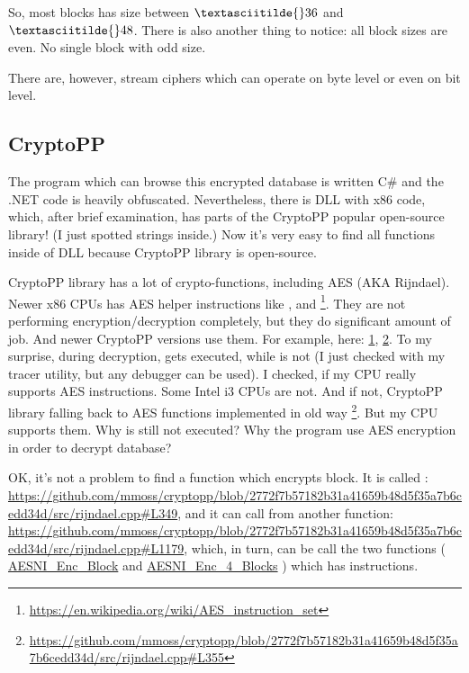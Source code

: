So, most blocks has size between $\textasciitilde{}36$ and $\textasciitilde{}48$.
There is also another thing to notice: all block sizes are even.
No single block with odd size.

There are, however, stream ciphers which can operate on byte level or even on bit level.

\subsection{CryptoPP}

The program which can browse this encrypted database is written C\# and the .NET code
is heavily obfuscated.
Nevertheless, there is DLL with x86 code, which, after brief examination,
has parts of the CryptoPP popular open-source library!
(I just spotted  strings inside.)
Now it's very easy to find all functions inside of DLL because CryptoPP library is open-source.

CryptoPP library has a lot of crypto-functions, including AES (AKA Rijndael).
Newer x86 CPUs has AES helper instructions like ,  and 
\footnote{\url{https://en.wikipedia.org/wiki/AES_instruction_set}}.
They are not performing encryption/decryption completely, but they do significant amount of job.
And newer CryptoPP versions use them.
For example, here:
\href{https://github.com/mmoss/cryptopp/blob/2772f7b57182b31a41659b48d5f35a7b6cedd34d/src/rijndael.cpp#L1034}{1},
\href{https://github.com/mmoss/cryptopp/blob/2772f7b57182b31a41659b48d5f35a7b6cedd34d/src/rijndael.cpp#L1000}{2}.
To my surprise, during decryption,  gets executed, while  is not
(I just checked with my tracer utility, but any debugger can be used).
I checked, if my CPU really supports AES instructions. Some Intel i3 CPUs are not.
And if not, CryptoPP library falling back to AES functions implemented in old way
\footnote{\url{https://github.com/mmoss/cryptopp/blob/2772f7b57182b31a41659b48d5f35a7b6cedd34d/src/rijndael.cpp#L355}}.
But my CPU supports them.
Why  is still not executed?
Why the program use AES encryption in order to decrypt database?

OK, it's not a problem to find a function which encrypts block.
It is called :\\
\url{https://github.com/mmoss/cryptopp/blob/2772f7b57182b31a41659b48d5f35a7b6cedd34d/src/rijndael.cpp#L349},
and it can call from another function: \\
\url{https://github.com/mmoss/cryptopp/blob/2772f7b57182b31a41659b48d5f35a7b6cedd34d/src/rijndael.cpp#L1179},
which, in turn, can be call the two functions (
\href{https://github.com/mmoss/cryptopp/blob/2772f7b57182b31a41659b48d5f35a7b6cedd34d/src/rijndael.cpp#L1000}{AESNI\_Enc\_Block}
and
\href{https://github.com/mmoss/cryptopp/blob/2772f7b57182b31a41659b48d5f35a7b6cedd34d/src/rijndael.cpp#L1012}{AESNI\_Enc\_4\_Blocks}
)
which has  instructions.

